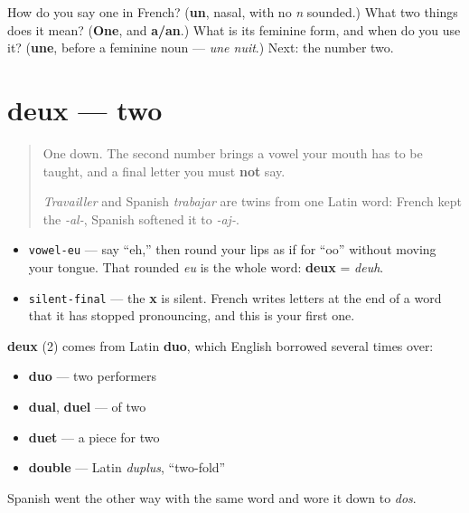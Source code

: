 \begin{tcolorbox}[breakable,colback=teal!4,colframe=teal!35!black,title={Before you move on}]
How do you say one in French? (\textbf{un}, nasal, with no \emph{n} sounded.) What two things does it mean? (\textbf{One}, and \textbf{a/an}.) What is its feminine form, and when do you use it? (\textbf{une}, before a feminine noun — \emph{une nuit}.) Next: the number two.
\end{tcolorbox}
\section[deux]{deux — two}

\label{lesson:FR-C06-deux}



\begin{quote}
One down. The second number brings a vowel your mouth has to be taught, and a final letter you must \textbf{not} say.

\emph{Travailler} and Spanish \emph{trabajar} are twins from one Latin word: French kept the \emph{-al-}, Spanish softened it to \emph{-aj-}.
\end{quote}

\begin{sounds}
\begin{itemize}
\raggedright
  \item \texttt{vowel-eu} — say \textquotedblleft{}eh,\textquotedblright{} then round your lips as if for \textquotedblleft{}oo\textquotedblright{} without moving your tongue. That rounded \emph{eu} is the whole word: \textbf{deux} = \emph{deuh}.
  \item \texttt{silent-final} — the \textbf{x} is silent. French writes letters at the end of a word that it has stopped pronouncing, and this is your first one.
\end{itemize}
\end{sounds}

\begin{cousinweb}
\textbf{deux} (2) comes from Latin \textbf{duo}, which English borrowed several times over:

\begin{itemize}
\raggedright
  \item \textbf{duo} — two performers
  \item \textbf{dual}, \textbf{duel} — of two
  \item \textbf{duet} — a piece for two
  \item \textbf{double} — Latin \emph{duplus}, \textquotedblleft{}two-fold\textquotedblright{}
\end{itemize}

Spanish went the other way with the same word and wore it down to \emph{dos}.
\end{cousinweb}

